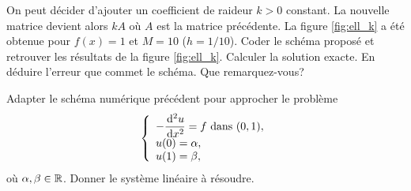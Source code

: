 \documentclass[12pt,a4paper,twoside]{article}
\begin{document}
\begin{exercise}
  On peut d\'ecider d'ajouter un coefficient de raideur $k>0$ constant.
  La nouvelle matrice devient alors $k A$ o\`u $A$ est la matrice 
  pr\'ec\'edente.
  La figure \ref{fig:ell_k} a \'et\'e obtenue pour $f(x) = 1$
  et $M=10$ ($h=1/10$).
  Coder le sch\'ema propos\'e et retrouver les r\'esultats
  de la figure \ref{fig:ell_k}.
  Calculer la solution exacte.
  En d\'eduire l'erreur que commet le sch\'ema.
  Que remarquez-vous?
\end{exercise}


\begin{exercise}
  Adapter le sch\'ema num\'erique pr\'ec\'edent pour approcher
  le probl\`eme
  \begin{align*}
    \left\{
    \begin{array}{l}
      - \dfrac{\!\;\mathrm{d}^2 u}{\!\;\mathrm{d} x^2} = f \text{ dans } (0,1) ,
      \\
      u(0) = \alpha ,
      \\
      u(1) = \beta ,
    \end{array}
    \right.
  \end{align*}
  o\`u $\alpha, \beta \in \mathbb{R}$.
  Donner le syst\`eme lin\'eaire \`a r\'esoudre.
\end{exercise}
\end{document}
